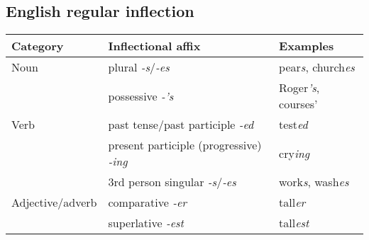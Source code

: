 \documentclass[letterpaper, 10pt]{article}
\begin{document}
\subsection{English regular inflection}
\begin{table}[H]
\centering
\begin{tabular}{lll}
\toprule
\textbf{Category}		& \textbf{Inflectional affix}		& \textbf{Examples}\\
\midrule
Noun				& plural \textit{-s}/\textit{-es}	& pear\textit{s}, church\textit{es}\\
					& possessive \textit{-'s}		& Roger\textit{'s}, courses'\\
Verb					& past tense/past participle \textit{-ed}	& test\textit{ed}\\
					& present participle (progressive) \textit{-ing}		& cry\textit{ing}\\
					& 3rd person singular \textit{-s}/\textit{-es}		& work\textit{s}, wash\textit{es}\\
Adjective/adverb		& comparative \textit{-er}		& tall\textit{er}\\
					& superlative \textit{-est}		& tall\textit{est}\\
\bottomrule
\end{tabular}
\end{table}
\end{document}

